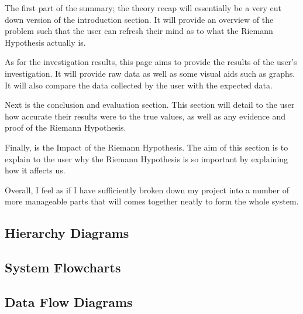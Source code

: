 \documentclass{article}
\begin{document}
The first part of the summary; the theory recap will essentially be a very cut down version of the introduction section. It will provide an overview of the problem such that the user can refresh their mind as to what the Riemann Hypothesis actually is.

As for the investigation results, this page aims to provide the results of the user's investigation. It will provide raw data as well as some visual aids such as graphs. It will also compare the data collected by the user with the expected data.

Next is the conclusion and evaluation section. This section will detail to the user how accurate their results were to the true values, as well as any evidence and proof of the Riemann Hypothesis.

Finally, is the Impact of the Riemann Hypothesis. The aim of this section is to explain to the user why the Riemann Hypothesis is so important by explaining how it affects us.


Overall, I feel as if I have sufficiently broken down my project into a number of more manageable parts that will comes together neatly to form the whole system.
\subsection{Hierarchy Diagrams}

\subsection{System Flowcharts}

\subsection{Data Flow Diagrams}

\clearpage
\end{document}

